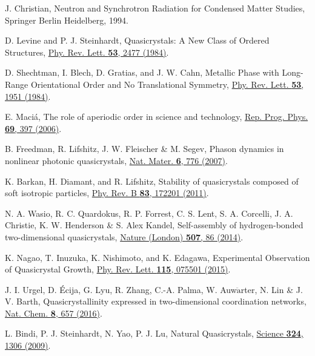 \documentclass[twocolumn,prl,floatfix,citeautoscript,nofootinbib]{revtex4}
\begin{document}

\begin{thebibliography}{99}
 J. Christian, {Neutron and Synchrotron Radiation for
Condensed Matter Studies}, Springer Berlin Heidelberg, 1994.

 D. Levine and P. J. Steinhardt, {Quasicrystals: A New
Class of Ordered Structures}, \href{https://doi.org/10.1103/PhysRevLett.53.2477}%
{Phy. Rev. Lett. \textbf{53}, 2477 (1984)}.

 D. Shechtman, I. Blech, D. Gratias, and J. W. Cahn, {%
Metallic Phase with Long-Range Orientational Order and No Translational
Symmetry}, \href{https://doi.org/10.1103/PhysRevLett.53.1951}{Phy. Rev.
Lett. \textbf{53}, 1951 (1984)}.

 E. Maci\'{a}, {The role of aperiodic order in science
and technology}, \href{https://doi.org/doi:10.1088/0034-4885/69/2/R03}{Rep.
Prog. Phys. \textbf{69}, 397 (2006)}.

 B. Freedman, R. Lifshitz, J. W. Fleischer \& M.
Segev, {Phason dynamics in nonlinear photonic quasicrystals}, \href{https://doi.org/doi:10.1038/nmat1981}%
{Nat. Mater. \textbf{6}, 776 (2007)}.

 K. Barkan, H. Diamant, and R. Lifshitz, {Stability of
quasicrystals composed of soft isotropic particles}, \href{https://doi.org/10.1103/PhysRevB.83.172201}%
{Phy. Rev. B \textbf{83}, 172201 (2011)}.

 N. A. Wasio, R. C. Quardokus, R. P. Forrest, C. S. Lent,
S. A. Corcelli, J. A. Christie, K. W. Henderson \& S. Alex Kandel, {%
Self-assembly of hydrogen-bonded two-dimensional quasicrystals}, \href{https://doi.org/doi:10.1038/nature12993}%
{Nature (London) \textbf{507}, 86 (2014)}.

 K. Nagao, T. Inuzuka, K. Nishimoto, and K. Edagawa, {%
Experimental Observation of Quasicrystal Growth}, \href{https://doi.org/10.1103/PhysRevLett.115.075501}%
{Phy. Rev. Lett. \textbf{115}, 075501 (2015)}.

 J. I. Urgel, D. \'{E}cija, G. Lyu, R. Zhang, C.-A.
Palma, W. Auw$\ddot{\text{a}}$rter, N. Lin \& J. V. Barth, {%
Quasicrystallinity expressed in two-dimensional coordination networks},
\href{https://doi.org/doi:10.1038/nchem.2507}{Nat. Chem. \textbf{8}, 657
(2016)}.

 L. Bindi, P. J. Steinhardt, N. Yao, P. J. Lu, {Natural
Quasicrystals}, \href{https://doi.org/10.1126/science.1170827}{Science
\textbf{324}, 1306 (2009)}.


\end{thebibliography}
\end{document}
